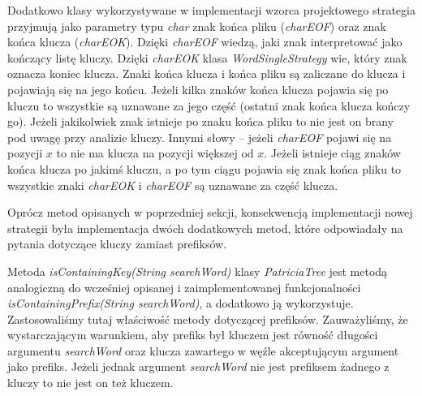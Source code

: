 \begin{figure}
		\end{figure}
		
		Dodatkowo klasy wykorzystywane w implementacji wzorca projektowego strategia przyjmują jako parametry typu \emph{char} znak końca pliku (\emph{charEOF}) oraz znak końca klucza (\emph{charEOK}). Dzięki \emph{charEOF} wiedzą, jaki znak interpretować jako kończący listę kluczy. Dzięki \emph{charEOK} klasa \emph{WordSingleStrategy} wie, który znak oznacza koniec klucza. Znaki końca klucza i końca pliku są zaliczane do klucza i pojawiają się na jego końcu. Jeżeli kilka znaków końca klucza pojawia się po kluczu to wszystkie są uznawane za jego część (ostatni znak końca klucza kończy go). Jeżeli jakikolwiek znak istnieje po znaku końca pliku to nie jest on brany pod uwagę przy analizie kluczy. \newpage Innymi słowy -- jeżeli \emph{charEOF} pojawi się na pozycji $x$ to nie ma klucza na pozycji większej od $x$. Jeżeli istnieje ciąg znaków końca klucza po jakimś kluczu, a po tym ciągu pojawia się znak końca pliku to wszystkie znaki \emph{charEOK} i \emph{charEOF} są uznawane za część klucza.
		
		Oprócz metod opisanych w poprzedniej sekcji, konsekwencją implementacji nowej strategii była implementacja dwóch dodatkowych metod, które odpowiadały na pytania dotyczące kluczy zamiast prefiksów.
		
		Metoda \emph{isContainingKey(String searchWord)} klasy \emph{PatriciaTree} jest metodą analogiczną do wcześniej opisanej i zaimplementowanej funkcjonalności \emph{isContainingPrefix(String searchWord)}, a dodatkowo ją wykorzystuje. Zastosowaliśmy tutaj właściwość metody dotyczącej prefiksów. Zauważyliśmy, że wystarczającym warunkiem, aby prefiks był kluczem jest równość długości argumentu \emph{searchWord} oraz klucza zawartego w węźle akceptującym argument jako prefiks. Jeżeli jednak argument \emph{searchWord} nie jest prefiksem żadnego z kluczy to nie jest on też kluczem.
		
